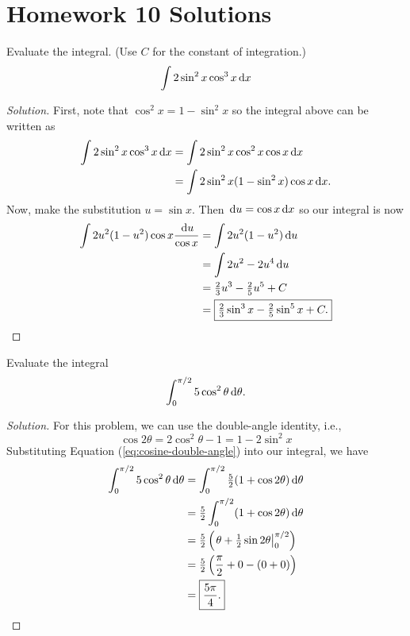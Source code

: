 \chapter{Homework 10 Solutions}
\begin{problem}[WebAssign HW 10, 1]
Evaluate the integral. (Use $C$ for the constant of integration.)
\[
\int 2\sin^2 x\cos^3 x\,\mathrm{d} x
\]
\end{problem}
\begin{proof}[Solution]
First, note that $\cos^2 x=1-\sin^2 x$ so the integral above can be written
as
\begin{align*}
\int 2\sin^2 x\cos^3 x\,\mathrm{d} x
&=\int 2\sin^2 x\cos^2 x\cos x\,\mathrm{d} x\\
&=\int 2\sin^2x(1-\sin^2 x)\cos x\,\mathrm{d} x.
\end{align*}
Now, make the substitution $u=\sin x$. Then $\,\mathrm{d} u=\cos x\,\mathrm{d} x$ so our
integral is now
\begin{align*}
\int 2u^2(1-u^2)\cos x\frac{\,\mathrm{d} u}{\cos x}
&=\int 2u^2(1-u^2)\,\mathrm{d} u\\
&=\int 2u^2-2u^4\,\mathrm{d} u\\
&=\tfrac{2}{3}u^3-\tfrac{2}{5}u^5+C\\
&=\boxed{\tfrac{2}{3}\sin^3 x-\tfrac{2}{5}\sin^5 x+C.}
\end{align*}
\end{proof}

\begin{problem}[WebAssign HW 10, 2]
Evaluate the integral
\[
\int_0^{\pi/2}5\cos^2\theta\,\mathrm{d}\theta.
\]
\end{problem}
\begin{proof}[Solution]
For this problem, we can use the double-angle identity, i.e.,
\begin{equation}
  \label{eq:cosine-double-angle}
\cos 2\theta=2\cos^2\theta-1=1-2\sin^2 x
\end{equation}
Substituting Equation (\ref{eq:cosine-double-angle}) into our integral, we
have
\begin{align*}
\int_0^{\pi/2}5\cos^2\theta\,\mathrm{d}\theta&=
\int_0^{\pi/2}\tfrac{5}{2}(1+\cos 2\theta)\,\mathrm{d}\theta\\
&=\tfrac{5}{2}\int_0^{\pi/2}(1+\cos 2\theta)\,\mathrm{d}\theta\\
&=\tfrac{5}{2}\left(\left.\theta+\tfrac{1}{2}\sin
  2\theta\right|_0^{\pi/2}\right)\\
&=\tfrac{5}{2}\left(\frac{\pi}{2}+0-(0+0)\right)\\
&=\boxed{\frac{5\pi}{4}.}
\end{align*}
\end{proof}

